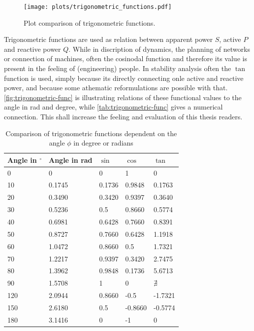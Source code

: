 \begin{figure}[H]
    \centering
    \texttt{[image: plots/trigonometric\_functions.pdf]}
    \caption[Plot comparison of trigonometric functions]{Plot comparison of trigonometric functions.}
    \label{fig:trigonometric-func}
\end{figure}

Trigonometric functions are used as relation between apparent power $S$, active $P$ and reactive power $Q$.
While in discription of dynamics, the planning of networks or connection of machines, often the cosinodal function and therefore its value is present in the feeling of (engineering) people.
In stability analysis often the $\tan$ function is used, simply because its directly connecting onle active and reactive power, and because some athematic reformulations are possible with that. 
\autoref{fig:trigonometric-func} is illustrating relations of these functional values to the angle in rad and degree, while \autoref{tab:trigonometric-func} gives a numerical connection.
This shall increase the feeling and evaluation of this thesis readers.

\begin{table}[H]
    \centering
    \small
    \caption{Comparison of trigonometric functions dependent on the angle $\phi$ in degree or radians}
    \label{tab:trigonometric-func}
    \vspace*{12pt}
    \begin{tabularx}{\linewidth}{XXXXX}
        \textbf{Angle in $^\circ$} & \textbf{Angle in rad} & \textbf{$\sin$} & \textbf{$\cos$} & \textbf{$\tan$} \\ \toprule
        0   & 0         & 0         & 1         & 0 \\
        10  & 0.1745    & 0.1736    & 0.9848    & 0.1763 \\
        20  & 0.3490    & 0.3420    & 0.9397    & 0.3640 \\
        30  & 0.5236    & 0.5       & 0.8660    & 0.5774 \\
        40  & 0.6981    & 0.6428    & 0.7660    & 0.8391 \\
        50  & 0.8727    & 0.7660    & 0.6428    & 1.1918 \\ 
        60  & 1.0472    & 0.8660    & 0.5       & 1.7321 \\
        70  & 1.2217    & 0.9397    & 0.3420    & 2.7475 \\
        80  & 1.3962    & 0.9848    & 0.1736    & 5.6713 \\
        90  & 1.5708    & 1         & 0         & $\nexists$ \\
        120 & 2.0944    & 0.8660    & -0.5      & -1.7321 \\
        150 & 2.6180    & 0.5       & -0.8660   & -0.5774 \\
        180 & 3.1416    & 0         & -1        & 0 \\
        \bottomrule
    \end{tabularx}
\end{table}


